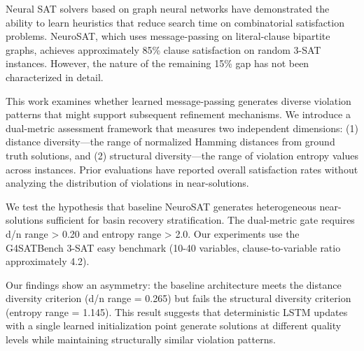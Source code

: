 
Neural SAT solvers based on graph neural networks have demonstrated the ability to learn heuristics that reduce search time on combinatorial satisfaction problems. NeuroSAT, which uses message-passing on literal-clause bipartite graphs, achieves approximately 85\% clause satisfaction on random 3-SAT instances. However, the nature of the remaining 15\% gap has not been characterized in detail.

This work examines whether learned message-passing generates diverse violation patterns that might support subsequent refinement mechanisms. We introduce a dual-metric assessment framework that measures two independent dimensions: (1) distance diversity—the range of normalized Hamming distances from ground truth solutions, and (2) structural diversity—the range of violation entropy values across instances. Prior evaluations have reported overall satisfaction rates without analyzing the distribution of violations in near-solutions.

We test the hypothesis that baseline NeuroSAT generates heterogeneous near-solutions sufficient for basin recovery stratification. The dual-metric gate requires d/n range > 0.20 and entropy range > 2.0. Our experiments use the G4SATBench 3-SAT easy benchmark (10-40 variables, clause-to-variable ratio approximately 4.2).

Our findings show an asymmetry: the baseline architecture meets the distance diversity criterion (d/n range = 0.265) but fails the structural diversity criterion (entropy range = 1.145). This result suggests that deterministic LSTM updates with a single learned initialization point generate solutions at different quality levels while maintaining structurally similar violation patterns.
